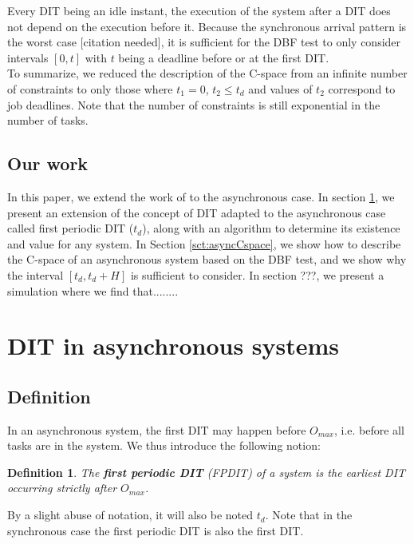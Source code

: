 \documentclass[conference]{IEEEtran}
\newtheorem{definition}{Definition}
\begin{document}
  Every DIT being an idle instant, the execution of the system after a DIT does
  not depend on the execution before it. Because the synchronous arrival pattern is
  the worst case [citation needed], it is sufficient for the DBF test to only
  consider intervals $[0, t]$ with $t$ being a deadline before or at the first DIT.\\

  To summarize, we reduced the description of the C-space from an infinite number
  of constraints to only those where $t_1 = 0$, $t_2 \leqslant t_d$ and
  values of $t_2$ correspond to job deadlines. Note that the number of
  constraints is still exponential in the number of tasks.

  \subsection{Our work}
    In this paper, we extend the work of \cite{george2009characterization} to the
    asynchronous case. In section \ref{sct:asyncDIT}, we present an extension of
    the concept of DIT adapted to the asynchronous case called first periodic DIT
    ($t_d$), along with an algorithm to determine its existence and value for any system. In Section
    \ref{sct:asyncCspace}, we show how to describe the C-space of an asynchronous
    system based on the DBF test, and we show why the interval $[t_d, t_d + H]$ is
    sufficient to consider. In section ???, we present a simulation where we find that........

\section{DIT in asynchronous systems}
  \label{sct:asyncDIT}

  \subsection{Definition}

    In an asynchronous system, the first DIT may happen before $O_{max}$, i.e. before all tasks are in the system. We thus introduce the following notion:

    \begin{definition}
      The \textbf{first periodic DIT} (FPDIT) of a system is the earliest DIT occurring
      strictly after $O_{max}$.
    \end{definition}

    By a slight abuse of notation, it will also be noted $t_d$. Note that in the
    synchronous case the first periodic DIT is also the first DIT.
\end{document}
